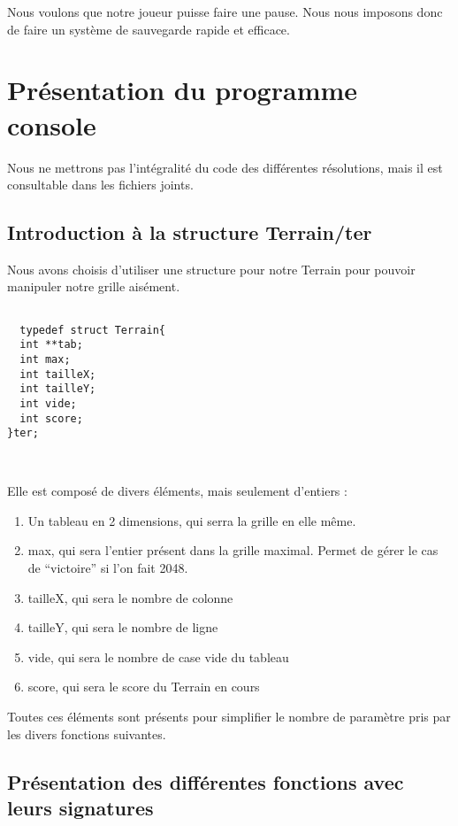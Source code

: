 \documentclass[letter]{article}
\begin{document}
Nous voulons que notre joueur puisse faire une pause. Nous nous imposons donc de faire un système de sauvegarde rapide et efficace.



\section{Présentation du programme console}
\label{sec:org8bf5eb3}

Nous ne mettrons pas l'intégralité du code des différentes résolutions, mais il est consultable dans les fichiers joints.

\subsection{Introduction à la structure Terrain/ter}
\label{sec:org13c0a0d}

Nous avons choisis d'utiliser une structure pour notre Terrain pour pouvoir manipuler notre grille aisément.

\begin{verbatim}

  typedef struct Terrain{
  int **tab;
  int max;
  int tailleX;
  int tailleY;
  int vide;
  int score;
}ter;



\end{verbatim}

Elle est composé de divers éléments, mais seulement d'entiers :

\begin{enumerate}
\item Un tableau en 2 dimensions, qui serra la grille en elle même.
\item max, qui sera l'entier présent dans la grille maximal. Permet de gérer le cas de “victoire” si l'on fait 2048.
\item tailleX, qui sera le nombre de colonne
\item tailleY, qui sera le nombre de ligne
\item vide, qui sera le nombre de case vide du tableau
\item score, qui sera le score du Terrain en cours
\end{enumerate}


Toutes ces éléments sont présents pour simplifier le nombre de paramètre pris par les divers fonctions suivantes.




\subsection{Présentation des différentes fonctions  avec leurs signatures}
\label{sec:orgbb13507}
\end{document}
